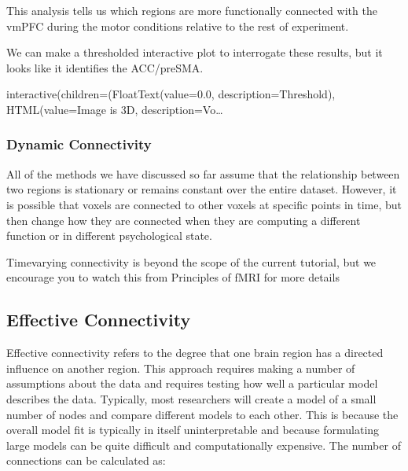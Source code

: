 \documentclass[letterpaper,10pt,english]{sphinxmanual}
\begin{document}
\noindent{}

This analysis tells us which regions are more functionally connected with the vmPFC during the motor conditions relative to the rest of experiment.

We can make a thresholded interactive plot to interrogate these results, but it looks like it identifies the ACC/pre\sphinxhyphen{}SMA.

\begin{sphinxVerbatim}[commandchars=\\\{\}]
\end{sphinxVerbatim}

\begin{sphinxVerbatim}[commandchars=\\\{\}]
interactive(children=(FloatText(value=0.0, description=\PYGZsq{}Threshold\PYGZsq{}), HTML(value=\PYGZsq{}Image is 3D\PYGZsq{}, description=\PYGZsq{}Vo…
\end{sphinxVerbatim}


\subsubsection{Dynamic Connectivity}
\label{\detokenize{content/Connectivity:dynamic-connectivity}}
All of the methods we have discussed so far assume that the relationship between two regions is stationary \sphinxhyphen{} or remains constant over the entire dataset. However, it is possible that voxels are connected to other voxels at specific points in time, but then change how they are connected when they are computing a different function or in different psychological state.

Time\sphinxhyphen{}varying connectivity is beyond the scope of the current tutorial, but we encourage you to watch this  from Principles of fMRI for more details


\subsection{Effective Connectivity}
\label{\detokenize{content/Connectivity:effective-connectivity}}
Effective connectivity refers to the degree that one brain region has a directed influence on another region. This approach requires making a number of assumptions about the data and requires testing how well a particular model describes the data. Typically, most researchers will create a model of a small number of nodes and compare different models to each other. This is because the overall model fit is typically in itself uninterpretable and because formulating large models can be quite difficult and computationally expensive. The number of connections can be calculated as:
\end{document}
